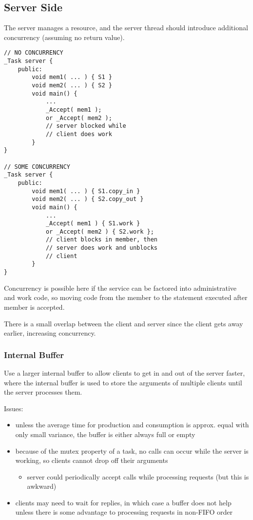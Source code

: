 \documentclass[11pt]{article}
\begin{document}
\subsection{Server Side}
\label{sec:org3f0421a}
The server manages a resource, and the server thread should introduce additional
concurrency (assuming no return value).
\begin{verbatim}
// NO CONCURRENCY
_Task server {
    public:
        void mem1( ... ) { S1 }
        void mem2( ... ) { S2 }
        void main() {
            ...
            _Accept( mem1 );
            or _Accept( mem2 );
            // server blocked while
            // client does work
        }
}

// SOME CONCURRENCY
_Task server {
    public:
        void mem1( ... ) { S1.copy_in }
        void mem2( ... ) { S2.copy_out }
        void main() {
            ...
            _Accept( mem1 ) { S1.work }
            or _Accept( mem2 ) { S2.work };
            // client blocks in member, then
            // server does work and unblocks
            // client
        }
}
\end{verbatim}
Concurrency is possible here if the service can be factored
into administrative and work code, so moving code from the member to the
statement executed after member is accepted.

There is a small overlap between the client and server since the client
gets away earlier, increasing concurrency.
\subsubsection{Internal Buffer}
\label{sec:org8934b74}
Use a larger internal buffer to allow clients to get in and out of the
server faster, where the internal buffer is used to store the arguments
of multiple clients until the server processes them.

Issues:
\begin{itemize}
\item unless the average time for production and consumption is approx. equal
with only small variance, the buffer is either always full or empty
\item because of the mutex property of a task, no calls can occur while the
server is working, so clients cannot drop off their arguments
\begin{itemize}
\item server could periodically accept calls while processing requests
(but this is awkward)
\end{itemize}
\item clients may need to wait for replies, in which case a buffer does not
help unless there is some advantage to processing requests in non-FIFO
order
\end{itemize}
\end{document}
